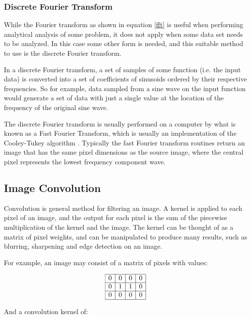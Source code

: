 \subsubsection{Discrete Fourier Transform}

While the Fourier transform as shown in equation \ref{fft} is useful when performing analytical analysis of some problem, it does not apply when some data set needs to be analyzed. In this case some other form is needed, and this suitable method to use is the discrete Fourier transform.

In a discrete Fourier transform, a set of samples of some function (i.e. the input data) is converted into a set of coefficients of sinusoids ordered by their respective frequencies. So for example, data sampled from a sine wave on the input function would generate a set of data with just a single value at the location of the frequency of the original sine wave.

The discrete Fourier transform is usually performed on a computer by what is known as a Fast Fourier Transform, which is usually an implementation of the Cooley-Tukey algorithm \citep{welch1967use}. Typically the fast Fourier transform routines return an image that has the same pixel dimensions as the source image, where the central pixel represents the lowest frequency component wave.

\subsection{Image Convolution}

Convolution is general method for filtering an image. A kernel is applied to each pixel of an image, and the output for each pixel is the sum of the piecewise multiplication of the kernel and the image. The kernel can be thought of as a matrix of pixel weights, and can be manipulated to produce many results, such as blurring, sharpening and edge detection on an image.

For example, an image may consist of a matrix of pixels with values:

\[
\begin{array}{|c|c|c|c|}
    \hline
0 & 0 & 0 & 0 \\
\hline
0 & 1 & 1 & 0 \\
\hline
0 & 0 & 0 & 0 \\
\hline
\end{array}
\]

And a convolution kernel of:

